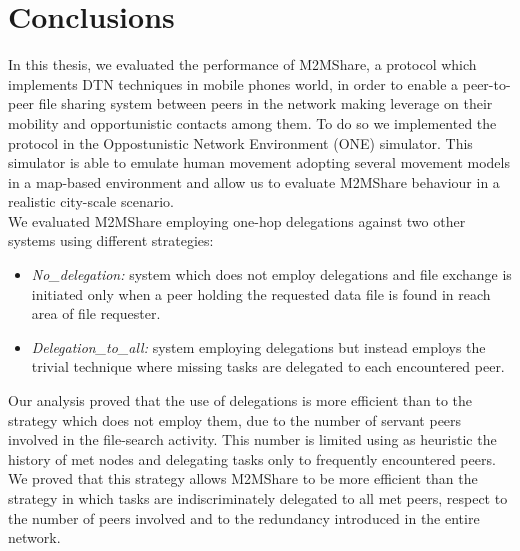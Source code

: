 
\chapter{Conclusions}\label{conclusioni} %





In this thesis, we evaluated the performance of M2MShare, a protocol which implements DTN techniques in mobile phones world, in order to enable a peer-to-peer file sharing system between peers in the network  making leverage on their mobility and opportunistic contacts among them. To do so we implemented the protocol in the Oppostunistic Network Environment (ONE) simulator. This simulator is able to emulate human movement adopting several movement models in a map-based environment and allow us to evaluate M2MShare behaviour in a realistic city-scale scenario.
\\

We evaluated M2MShare employing one-hop delegations against two other systems using different strategies:
\begin{itemize}
\item \textit{No\_delegation:} system which does not employ delegations and file exchange is initiated only when a peer holding the requested data file is found in reach area of file requester.
\item \textit{Delegation\_to\_all:} system employing delegations but instead employs the trivial technique where missing tasks are delegated to each encountered peer.
\end{itemize}
Our analysis proved that the use of delegations is more efficient than to the strategy which does not employ them, due to the number of servant peers involved in the file-search activity. This number is limited using as heuristic the history of met nodes and delegating tasks only to frequently encountered peers. We proved that this strategy allows M2MShare to be more efficient than the strategy in which tasks are indiscriminately delegated to all met peers, respect to the number of peers involved and to the redundancy introduced in the entire network.
\\

